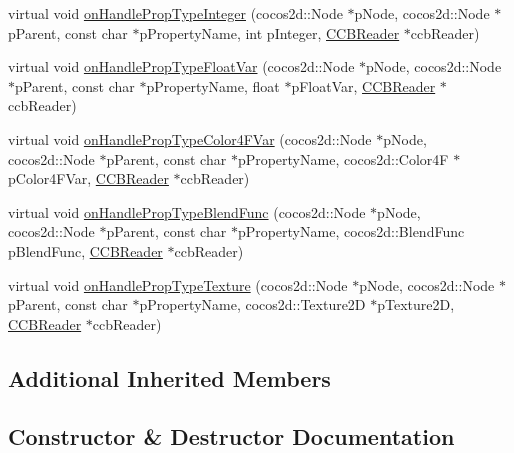 \begin{DoxyCompactItemize}
\item 
virtual void \hyperlink{classcocosbuilder_1_1ParticleSystemQuadLoader_a250882ee759f89e1211db8bab109fbc9}{on\+Handle\+Prop\+Type\+Integer} (cocos2d\+::\+Node $\ast$p\+Node, cocos2d\+::\+Node $\ast$p\+Parent, const char $\ast$p\+Property\+Name, int p\+Integer, \hyperlink{classcocosbuilder_1_1CCBReader}{C\+C\+B\+Reader} $\ast$ccb\+Reader)
\item 
virtual void \hyperlink{classcocosbuilder_1_1ParticleSystemQuadLoader_a7e9cb837e30bc92d78d6755b3565a75a}{on\+Handle\+Prop\+Type\+Float\+Var} (cocos2d\+::\+Node $\ast$p\+Node, cocos2d\+::\+Node $\ast$p\+Parent, const char $\ast$p\+Property\+Name, float $\ast$p\+Float\+Var, \hyperlink{classcocosbuilder_1_1CCBReader}{C\+C\+B\+Reader} $\ast$ccb\+Reader)
\item 
virtual void \hyperlink{classcocosbuilder_1_1ParticleSystemQuadLoader_ab31492ee9f4834fd84213d39cfa5a538}{on\+Handle\+Prop\+Type\+Color4\+F\+Var} (cocos2d\+::\+Node $\ast$p\+Node, cocos2d\+::\+Node $\ast$p\+Parent, const char $\ast$p\+Property\+Name, cocos2d\+::\+Color4F $\ast$p\+Color4\+F\+Var, \hyperlink{classcocosbuilder_1_1CCBReader}{C\+C\+B\+Reader} $\ast$ccb\+Reader)
\item 
virtual void \hyperlink{classcocosbuilder_1_1ParticleSystemQuadLoader_a9beea0b8c5da3ce78cbc214759273ddc}{on\+Handle\+Prop\+Type\+Blend\+Func} (cocos2d\+::\+Node $\ast$p\+Node, cocos2d\+::\+Node $\ast$p\+Parent, const char $\ast$p\+Property\+Name, cocos2d\+::\+Blend\+Func p\+Blend\+Func, \hyperlink{classcocosbuilder_1_1CCBReader}{C\+C\+B\+Reader} $\ast$ccb\+Reader)
\item 
virtual void \hyperlink{classcocosbuilder_1_1ParticleSystemQuadLoader_a772ee73c21507af525fa3464dd99f44a}{on\+Handle\+Prop\+Type\+Texture} (cocos2d\+::\+Node $\ast$p\+Node, cocos2d\+::\+Node $\ast$p\+Parent, const char $\ast$p\+Property\+Name, cocos2d\+::\+Texture2D $\ast$p\+Texture2D, \hyperlink{classcocosbuilder_1_1CCBReader}{C\+C\+B\+Reader} $\ast$ccb\+Reader)
\end{DoxyCompactItemize}
\subsection*{Additional Inherited Members}


\subsection{Constructor \& Destructor Documentation}
\mbox{\label{classcocosbuilder_1_1ParticleSystemQuadLoader_a55628f9438027cecd887cef4bb2079a6}} 
